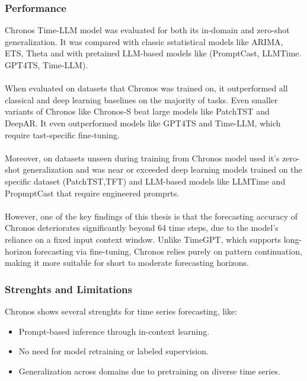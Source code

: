 \documentclass{article}
\begin{document}
\subsubsection{Performance}
Chronos Time-LLM model was evaluated for both its in-domain and zero-shot generalization. It was compared with classic sstatistical models like ARIMA, ETS, Theta and with pretained LLM-based models like (PromptCast, LLMTime. GPT4TS, Time-LLM).\\
\\
When evaluated on datasets that Chronos was trained on, it outperformed all classical and deep learning baselines on the majority of tasks. Even smaller variants of Chronos like Chronos-S beat large models like PatchTST and DeepAR. It even outperformed models like GPT4TS and Time-LLM, which require tast-specific fine-tuning.\\
\\
Moreover, on datasets unseen during training from Chronos model used it's zero-shot generalization and was near or exceeded deep learning models trained on the specific dataset (PatchTST,TFT) and LLM-based models like LLMTime and PropmptCast that require engineered promprts.\\
\\
However, one of the key findings of this thesis is that the forecasting accuracy of Chronos deteriorates significantly beyond 64 time steps, due to the model’s reliance on a fixed input context window. Unlike TimeGPT, which supports long-horizon forecasting via fine-tuning, Chronos relies purely on pattern continuation, making it more suitable for short to moderate forecasting horizons.

\subsubsection{Strenghts and Limitations}
Chronos shows several strenghts for time series forecasting, like:

\begin{itemize}
    \item Prompt-based inference through in-context learning.
\end{itemize}

\begin{itemize}
    \item No need for model retraining or labeled supervision.
\end{itemize}

\begin{itemize}
    \item Generalization across domains due to pretraining on diverse time series.
\end{itemize}
\end{document}
